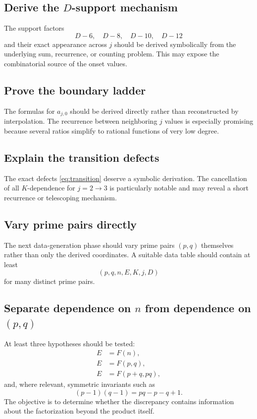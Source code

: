 \documentclass[11pt,a4paper]{article}
\begin{document}
\subsection{Derive the $D$-support mechanism}
The support factors
\[
D-6,\quad D-8,\quad D-10,\quad D-12
\]
and their exact appearance across $j$ should be derived symbolically from the underlying sum, recurrence, or counting problem. This may expose the combinatorial source of the onset values.

\subsection{Prove the boundary ladder}
The formulas for $a_{j,0}$ should be derived directly rather than reconstructed by interpolation. The recurrence between neighboring $j$ values is especially promising because several ratios simplify to rational functions of very low degree.

\subsection{Explain the transition defects}
The exact defects \eqref{eq:transition} deserve a symbolic derivation. The cancellation of all $K$-dependence for $j=2\to3$ is particularly notable and may reveal a short recurrence or telescoping mechanism.

\subsection{Vary prime pairs directly}
The next data-generation phase should vary prime pairs $(p,q)$ themselves rather than only the derived coordinates. A suitable data table should contain at least
\[
(p,q,n,E, K,j,D)
\]
for many distinct prime pairs.

\subsection{Separate dependence on $n$ from dependence on $(p,q)$}
At least three hypotheses should be tested:
\begin{align}
E&=F(n),\\
E&=F(p,q),\\
E&=F(p+q,pq),
\end{align}
and, where relevant, symmetric invariants such as
\[
(p-1)(q-1)=pq-p-q+1.
\]
The objective is to determine whether the discrepancy contains information about the factorization beyond the product itself.
\end{document}
